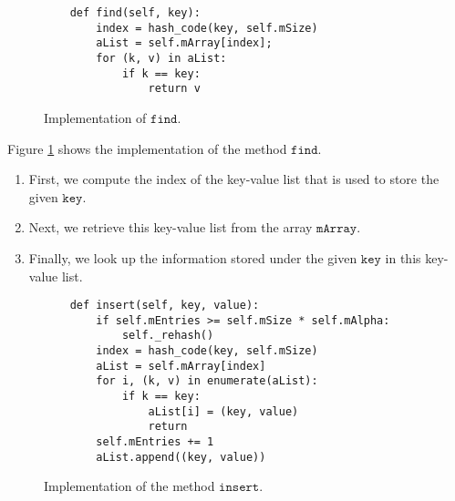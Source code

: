 \begin{figure}[!ht]
\centering
\begin{verbatim}
    def find(self, key):
        index = hash_code(key, self.mSize)
        aList = self.mArray[index];
        for (k, v) in aList:
            if k == key:
                return v
\end{verbatim}
\vspace*{-0.3cm}
\caption{Implementation of $\texttt{find}$.}
\label{fig:HashMap.ipynb-find}
\end{figure}

Figure \ref{fig:HashMap.ipynb-find} shows the implementation of the method $\texttt{find}$.
\begin{enumerate}
\item First, we compute the index of the key-value list that is used to store the given
      $\texttt{key}$.
\item Next, we retrieve this key-value list from the array $\texttt{mArray}$.
\item Finally, we look up the information stored under the given $\texttt{key}$ in this key-value list.
\end{enumerate}

\begin{figure}[!ht]
\centering
\begin{verbatim}
    def insert(self, key, value):
        if self.mEntries >= self.mSize * self.mAlpha:
            self._rehash()
        index = hash_code(key, self.mSize)
        aList = self.mArray[index]
        for i, (k, v) in enumerate(aList):
            if k == key:
                aList[i] = (key, value) 
                return
        self.mEntries += 1
        aList.append((key, value))
\end{verbatim}
\vspace*{-0.3cm}
\caption{Implementation of the method $\texttt{insert}$.}
\label{fig:hashTable.ipython-insert}
\end{figure}

